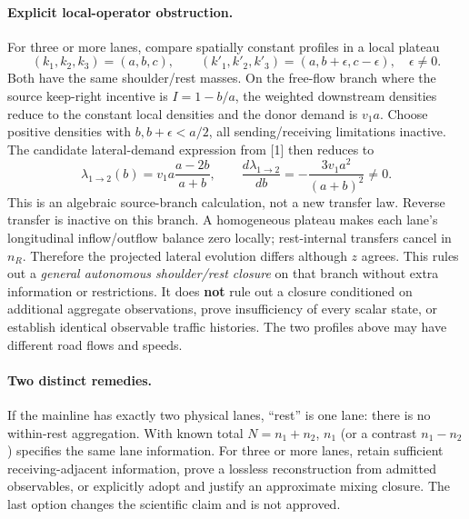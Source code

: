 \documentclass[10pt,a4paper]{article}
\begin{document}
\paragraph{Explicit local-operator obstruction.}
For three or more lanes, compare spatially constant profiles in a local plateau
\begin{equation}
 (k_1,k_2,k_3)=(a,b,c),\qquad
 (k'_1,k'_2,k'_3)=(a,b+\epsilon,c-\epsilon),\quad \epsilon\ne0.
\end{equation}
Both have the same shoulder/rest masses. On the free-flow branch where the
source keep-right incentive is $I=1-b/a$, the weighted downstream densities
reduce to the constant local densities and the donor demand is $v_1a$.
Choose positive densities with $b,b+\epsilon<a/2$, all sending/receiving
limitations inactive. The candidate lateral-demand expression from [1] then
reduces to
\begin{equation}
 \lambda_{1\to2}(b)=v_1a\frac{a-2b}{a+b},\qquad
 \frac{d\lambda_{1\to2}}{db}=-\frac{3v_1a^2}{(a+b)^2}\ne0. \label{eq:lateral}
\end{equation}
This is an algebraic source-branch calculation, not a new transfer law.
Reverse transfer is inactive on this branch. A homogeneous plateau makes each
lane's longitudinal inflow/outflow balance zero locally; rest-internal
transfers cancel in $n_R$. Therefore the projected lateral evolution differs
although $z$ agrees. This rules out a \emph{general autonomous shoulder/rest
closure} on that branch without extra information or restrictions.
It does \textbf{not} rule out a closure conditioned on additional aggregate
observations, prove insufficiency of every scalar state, or establish identical
observable traffic histories. The two profiles above may have different road
flows and speeds.

\paragraph{Two distinct remedies.}
If the mainline has exactly two physical lanes, ``rest'' is one lane:
there is no within-rest aggregation. With known total $N=n_1+n_2$,
$n_1$ (or a contrast $n_1-n_2$) specifies the same lane information.
For three or more lanes, retain sufficient receiving-adjacent information,
prove a lossless reconstruction from admitted observables, or explicitly
adopt and justify an approximate mixing closure. The last option changes
the scientific claim and is not approved.
\end{document}
